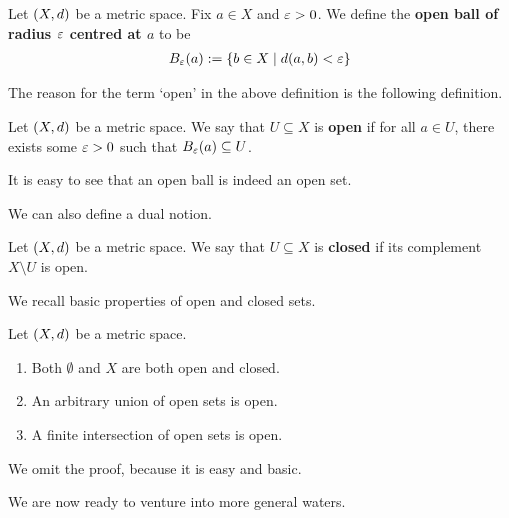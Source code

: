 \begin{boxdefinition}
    Let $\left( X, d \right)$ be a metric space. Fix $a \in X$ and $\varepsilon > 0$. We define the \textbf{open ball of radius $\varepsilon$ centred at $a$} to be
    \begin{align*}
        B_{\varepsilon}\!\left( a \right) := \left\{ b \in X \; \middle\vert \; d\!\left( a, b \right) < \varepsilon \right\}
    \end{align*}
\end{boxdefinition}

The reason for the term `open' in the above definition is the following definition.

\begin{boxdefinition}\label{Ch1:Def:Open_Sets_Metric_Spaces}
    Let $\left( X, d \right)$ be a metric space. We say that $U \subseteq X$ is \textbf{open} if for all $a \in U$, there exists some $\varepsilon > 0$ such that $B_{\varepsilon}\!\left( a \right) \subseteq U$.
\end{boxdefinition}

It is easy to see that an open ball is indeed an open set.

We can also define a dual notion.

\begin{boxdefinition}
    Let $\left( X, d \right)$ be a metric space. We say that $U \subseteq X$ is \textbf{closed} if its complement $X \setminus U$ is open.
\end{boxdefinition}

We recall basic properties of open and closed sets.

\begin{boxproposition}\label{Ch1:Prop:Properties_of_Open_Sets}
    Let $\left( X, d \right)$ be a metric space.
    \begin{enumerate}
        \item Both $\emptyset$ and $X$ are both open and closed.
        \item An arbitrary union of open sets is open.
        \item A finite intersection of open sets is open.
    \end{enumerate}
\end{boxproposition}

We omit the proof, because it is easy and basic.

We are now ready to venture into more general waters.
